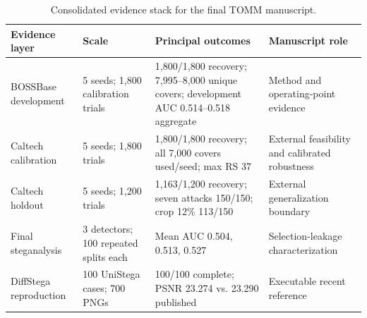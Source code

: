 \begin{table}[t]
\caption{Consolidated evidence stack for the final TOMM manuscript.}
\label{tab:evidence-summary}
\small
\begin{tabularx}{\textwidth}{@{}lXXX@{}}
\toprule
Evidence layer & Scale & Principal outcomes & Manuscript role \\
\midrule
BOSSBase development & 5 seeds; 1,800 calibration trials & 1,800/1,800 recovery; 7,995--8,000 unique covers; development AUC 0.514--0.518 aggregate & Method and operating-point evidence \\
Caltech calibration & 5 seeds; 1,800 trials & 1,800/1,800 recovery; all 7,000 covers used/seed; max RS 37 & External feasibility and calibrated robustness \\
Caltech holdout & 5 seeds; 1,200 trials & 1,163/1,200 recovery; seven attacks 150/150; crop 12\% 113/150 & External generalization boundary \\
Final steganalysis & 3 detectors; 100 repeated splits each & Mean AUC 0.504, 0.513, 0.527 & Selection-leakage characterization \\
DiffStega reproduction & 100 UniStega cases; 700 PNGs & 100/100 complete; PSNR 23.274 vs. 23.290 published & Executable recent reference \\
\bottomrule
\end{tabularx}
\end{table}
